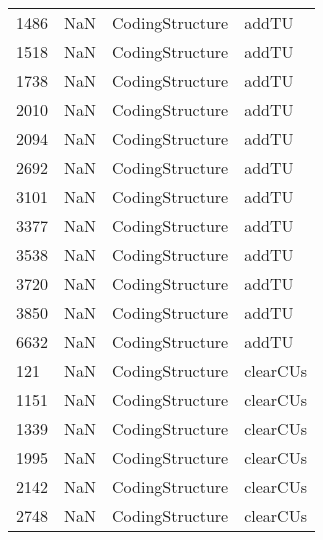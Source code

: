 \begin{tabular}{llll}
1486 &                   NaN &            CodingStructure &                                     addTU \\
1518 &                   NaN &            CodingStructure &                                     addTU \\
1738 &                   NaN &            CodingStructure &                                     addTU \\
2010 &                   NaN &            CodingStructure &                                     addTU \\
2094 &                   NaN &            CodingStructure &                                     addTU \\
2692 &                   NaN &            CodingStructure &                                     addTU \\
3101 &                   NaN &            CodingStructure &                                     addTU \\
3377 &                   NaN &            CodingStructure &                                     addTU \\
3538 &                   NaN &            CodingStructure &                                     addTU \\
3720 &                   NaN &            CodingStructure &                                     addTU \\
3850 &                   NaN &            CodingStructure &                                     addTU \\
6632 &                   NaN &            CodingStructure &                                     addTU \\
121  &                   NaN &            CodingStructure &                                  clearCUs \\
1151 &                   NaN &            CodingStructure &                                  clearCUs \\
1339 &                   NaN &            CodingStructure &                                  clearCUs \\
1995 &                   NaN &            CodingStructure &                                  clearCUs \\
2142 &                   NaN &            CodingStructure &                                  clearCUs \\
2748 &                   NaN &            CodingStructure &                                  clearCUs \\

\end{tabular}
